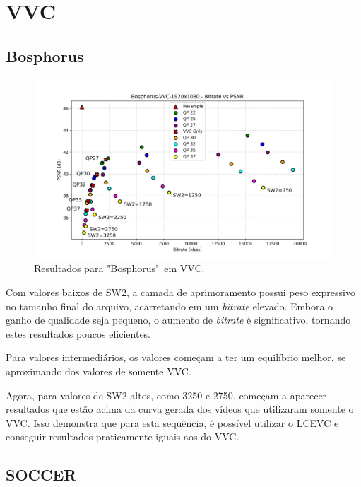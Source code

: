 \newpage

\section{VVC}

\subsection{Bosphorus}

\begin{figure}[h]
    \centering
    \includegraphics[width=1.0\textwidth]{img/Bosphorus-VVC.png}
    \caption{Resultados para "Bosphorus"\ em \acrshort{VVC}. \cite{uvg_dataset}}
    \label{fig:Bosphorus-VVC}
\end{figure}

Com valores baixos de SW2, a camada de aprimoramento possui peso expressivo no tamanho final
do arquivo, acarretando em um \textit{bitrate} elevado. Embora o ganho de qualidade seja pequeno, 
o aumento de \textit{bitrate} é significativo, tornando estes resultados poucos eficientes.

Para valores intermediários, os valores começam a ter um equilíbrio melhor, se aproximando dos
valores de somente \acrshort{VVC}.

Agora, para valores de SW2 altos, como 3250 e 2750, começam a aparecer resultados que estão
acima da curva gerada dos vídeos que utilizaram somente o \acrshort{VVC}. Isso demonstra
que para esta sequência, é possível utilizar o \acrshort{LCEVC} e conseguir resultados
praticamente iguais aos do \acrshort{VVC}.

\newpage
\subsection{SOCCER}

